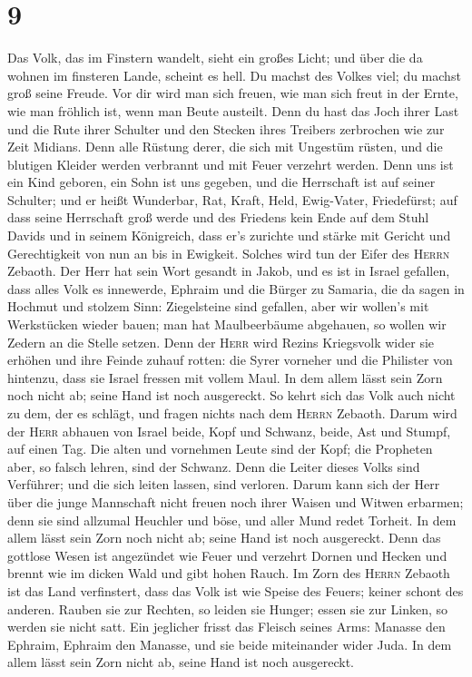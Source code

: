 \hypertarget{section-8}{%
\section{9}\label{section-8}}

 Das Volk, das im Finstern wandelt, sieht ein großes
Licht; und über die da wohnen im finsteren Lande, scheint es hell.
 Du machst des Volkes viel; du machst groß seine Freude.
Vor dir wird man sich freuen, wie man sich freut in der Ernte, wie man
fröhlich ist, wenn man Beute austeilt.  Denn du hast das
Joch ihrer Last und die Rute ihrer Schulter und den Stecken ihres
Treibers zerbrochen wie zur Zeit Midians.  Denn alle
Rüstung derer, die sich mit Ungestüm rüsten, und die blutigen Kleider
werden verbrannt und mit Feuer verzehrt werden.  Denn uns
ist ein Kind geboren, ein Sohn ist uns gegeben, und die Herrschaft ist
auf seiner Schulter; und er heißt Wunderbar, Rat, Kraft, Held,
Ewig-Vater, Friedefürst;  auf dass seine Herrschaft groß
werde und des Friedens kein Ende auf dem Stuhl Davids und in seinem
Königreich, dass er's zurichte und stärke mit Gericht und Gerechtigkeit
von nun an bis in Ewigkeit. Solches wird tun der Eifer des
\textsc{Herrn} Zebaoth.  Der Herr hat sein Wort gesandt in
Jakob, und es ist in Israel gefallen,  dass alles Volk es
innewerde, Ephraim und die Bürger zu Samaria, die da sagen in Hochmut
und stolzem Sinn:  Ziegelsteine sind gefallen, aber wir
wollen's mit Werkstücken wieder bauen; man hat Maulbeerbäume abgehauen,
so wollen wir Zedern an die Stelle setzen.  Denn der
\textsc{Herr} wird Rezins Kriegsvolk wider sie erhöhen und ihre Feinde
zuhauf rotten:  die Syrer vorneher und die Philister von
hintenzu, dass sie Israel fressen mit vollem Maul. In dem allem lässt
sein Zorn noch nicht ab; seine Hand ist noch ausgereckt. 
So kehrt sich das Volk auch nicht zu dem, der es schlägt, und fragen
nichts nach dem \textsc{Herrn} Zebaoth.  Darum wird der
\textsc{Herr} abhauen von Israel beide, Kopf und Schwanz, beide, Ast und
Stumpf, auf einen Tag.  Die alten und vornehmen Leute
sind der Kopf; die Propheten aber, so falsch lehren, sind der Schwanz.
 Denn die Leiter dieses Volks sind Verführer; und die
sich leiten lassen, sind verloren.  Darum kann sich der
Herr über die junge Mannschaft nicht freuen noch ihrer Waisen und Witwen
erbarmen; denn sie sind allzumal Heuchler und böse, und aller Mund redet
Torheit. In dem allem lässt sein Zorn noch nicht ab; seine Hand ist noch
ausgereckt.  Denn das gottlose Wesen ist angezündet wie
Feuer und verzehrt Dornen und Hecken und brennt wie im dicken Wald und
gibt hohen Rauch.  Im Zorn des \textsc{Herrn} Zebaoth ist
das Land verfinstert, dass das Volk ist wie Speise des Feuers; keiner
schont des anderen.  Rauben sie zur Rechten, so leiden
sie Hunger; essen sie zur Linken, so werden sie nicht satt. Ein
jeglicher frisst das Fleisch seines Arms:  Manasse den
Ephraim, Ephraim den Manasse, und sie beide miteinander wider Juda. In
dem allem lässt sein Zorn nicht ab, seine Hand ist noch ausgereckt.

